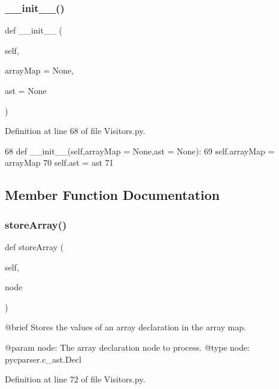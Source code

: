 \subsubsection{\texorpdfstring{\+\_\+\+\_\+init\+\_\+\+\_\+()}{\_\_init\_\_()}}
{\footnotesize\ttfamily def \+\_\+\+\_\+init\+\_\+\+\_\+ (\begin{DoxyParamCaption}\item[{}]{self,  }\item[{}]{array\+Map = {\ttfamily None},  }\item[{}]{ast = {\ttfamily None} }\end{DoxyParamCaption})}



Definition at line 68 of file Visitors.\+py.


\begin{DoxyCode}
68     \textcolor{keyword}{def }\_\_init\_\_(self,arrayMap = None,ast = None):
69         self.arrayMap = arrayMap
70         self.ast = ast
71 
\end{DoxyCode}


\subsection{Member Function Documentation}
\mbox{\label{classVisitors_1_1DeclVisitor_a9e0516fab7677e7c20e7761b239d5a88}} 
\subsubsection{\texorpdfstring{store\+Array()}{storeArray()}}
{\footnotesize\ttfamily def store\+Array (\begin{DoxyParamCaption}\item[{}]{self,  }\item[{}]{node }\end{DoxyParamCaption})}

\begin{DoxyVerb}@brief Stores the values of an array declaration in the array map.

@param node: The array declaration node to process.
@type node: pycparser.c_ast.Decl
\end{DoxyVerb}
 

Definition at line 72 of file Visitors.\+py.


